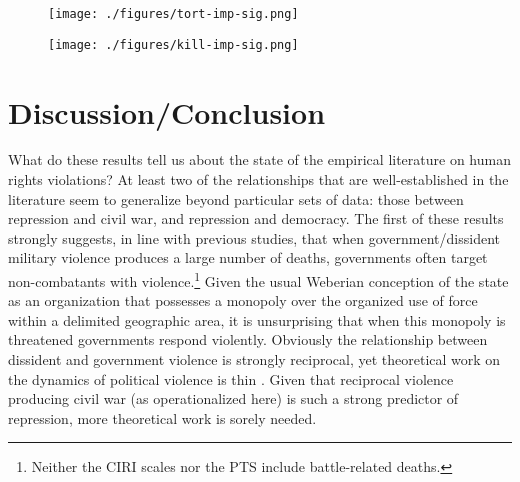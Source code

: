 \documentclass[12pt]{article}
\begin{document}
\begin{figure}[!htpb]
\centering
\texttt{[image: ./figures/tort-imp-sig.png]}
\caption{}
\label{fig:tort-imp}
\end{figure}

\begin{figure}[!htpb]
\centering
\texttt{[image: ./figures/kill-imp-sig.png]}
\caption{}
\label{fig:kill-imp}
\end{figure}

\section{Discussion/Conclusion}

What do these results tell us about the state of the empirical literature on human rights violations? At least two of the relationships that are well-established in the literature seem to generalize beyond particular sets of data: those between repression and civil war, and repression and democracy. The first of these results strongly suggests, in line with previous studies, that when government/dissident military violence produces a large number of deaths, governments often target non-combatants with violence.\footnote{Neither the CIRI scales nor the PTS include battle-related deaths.} Given the usual Weberian conception of the state as an organization that possesses a monopoly over the organized use of force within a delimited geographic area, it is unsurprising that when this monopoly is threatened governments respond violently. Obviously the relationship between dissident and government violence is strongly reciprocal, yet theoretical work on the dynamics of political violence is thin \citep[But see, e.g.][]{Moore2000,Pierskalla2010,RitterJCR}. Given that reciprocal violence producing civil war (as operationalized here) is such a strong predictor of repression, more theoretical work is sorely needed. 
\end{document}
